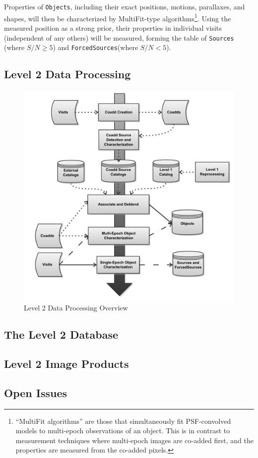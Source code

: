 \documentclass[12pt]{article}
\newcommand{\code}[1]{\texttt{#1}}
\newcommand{\Objects}{\code{Objects}\xspace}
\newcommand{\Sources}{\code{Sources}\xspace}
\newcommand{\ForcedSources}{\code{ForcedSources}\xspace}
\begin{document}
Properties of \Objects, including their exact positions, motions, parallaxes,
and shapes, will then be characterized by MultiFit-type
algorithms\footnote{``MultiFit algorithms'' are those that simultaneously fit
PSF-convolved models to multi-epoch observations of an object. This is in
contrast to measurement techniques where multi-epoch images are co-added
first, and the properties are measured from the co-added pixels.}.
Using the measured position as a strong prior, their properties in individual 
visits (independent of any others) will be measured, forming the table of \Sources
(where $S/N \ge 5$) and \ForcedSources (where $S/N < 5$).

\subsection{Level 2 Data Processing}

\begin{figure}[h]
    \centering
    \includegraphics[scale=0.5]{Level_2_Processing_Flowchart}
    \caption{Level 2 Data Processing Overview}    
\end{figure}

\subsection{The Level 2 Database}

\subsection{Level 2 Image Products}

\subsection{Open Issues}
\end{document}
